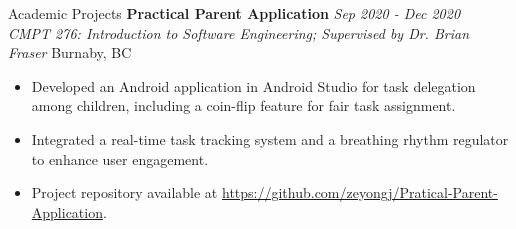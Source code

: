 \documentclass{resume} %
\begin{document}
\begin{rSection}{Academic Projects}
{\bf Practical Parent Application} \hfill {\em Sep 2020 - Dec 2020}  
\\{\textit{CMPT 276: Introduction to Software Engineering; Supervised by Dr. Brian Fraser} \hfill {Burnaby, BC}}  
\begin{itemize}
    \vspace{-0.2cm} \item Developed an Android application in Android Studio for task delegation among children, including a coin-flip feature for fair task assignment.  
    \vspace{-0.2cm} \item Integrated a real-time task tracking system and a breathing rhythm regulator to enhance user engagement.  
    \vspace{-0.2cm} \item Project repository available at \url{https://github.com/zeyongj/Pratical-Parent-Application}.  
\end{itemize}



\end{rSection}
\end{document}
